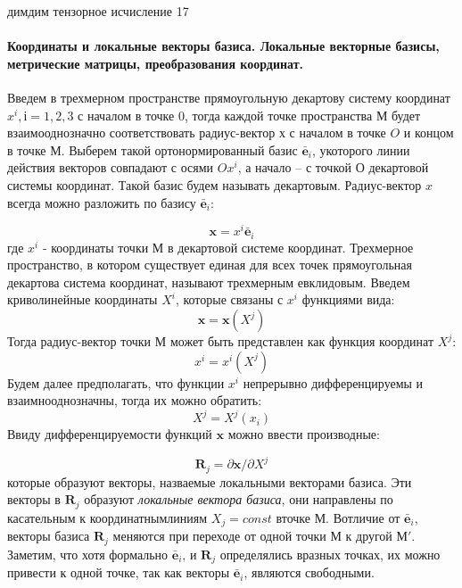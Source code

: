 димдим тензорное исчисление 17

\paragraph{ Координаты и локальные векторы базиса. Локальные векторные базисы, метрические матрицы, преобразования координат.}
Введем в трехмерном пространстве прямоугольную декартову систему координат $x^i, і= 1, 2, 3$ с началом в точке 0, тогда каждой точке пространства $М$ будет взаимооднозначно соответствовать радиус-вектор $х$ с началом в точке $O$ и концом в точке $М$. Выберем такой ортонормированный базис $\bar{\textbf{e}}_i$, укоторого линии действия векторов совпадают с осями $Ox^i$, а начало -- с точкой $О$ декартовой системы координат. Такой базис будем называть декартовым. Радиус-вектор $x$ всегда можно разложить по базису $\bar{\textbf{e}}_i$:

\begin{equation*}
    \textbf{x} = x^i\bar{\textbf{e}}_i
\end{equation*}
где $x^i$ - координаты точки $М$ в декартовой системе координат. Трехмерное пространство, в котором существует единая для всех точек прямоугольная декартова система координат, называют трехмерным евклидовым.
Введем криволинейные координаты $X^i$, которые связаны с $x^i$ функциями вида:
\begin{equation*}
    \textbf{x} = \textbf{x}(X^j)
\end{equation*}
Тогда радиус-вектор точки $М$ может быть представлен как функция координат 
$X^j$:
\begin{equation*}
    x^i = x^i(X^j)
\end{equation*}
Будем далее предполагать, что функции $x^i$ непрерывно дифференцируемы и взаимнооднозначны, тогда их можно обратить:
\begin{equation*}
    X^j = X^j(x_i)
\end{equation*}
Ввиду дифференцируемости функций $\textbf{x}$ можно ввести производные:

\begin{equation*}
    \textbf{R}_j = \partial\textbf{x}/\partial X^j
\end{equation*}
которые образуют векторы, назваемые локальными векторами базиса. Эти векторы в $\textbf{R}_j$ образуют \textit{локальные вектора базиса}, они направлены по касательным к координатнымлиниям $X_j=const$ вточке $М$.
Вотличие от $\bar{\textbf{e}}_i$, векторы базиса $\textbf{R}_j$  меняются при переходе от одной точки $М$ к другой $М'$.
Заметим, что хотя формально $\bar{\textbf{e}}_i$, и $\textbf{R}_j$ определялись вразных точках, их можно привести к одной точке, так как векторы $\bar{\textbf{e}}_i$, являются свободными.


